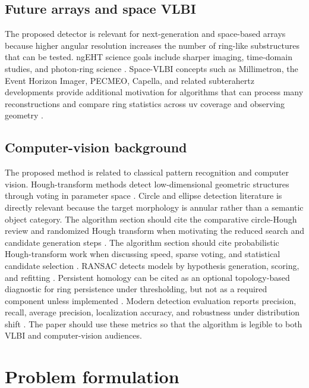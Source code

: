 \documentclass[11pt]{article}
\begin{document}
\subsection{Future arrays and space VLBI}
The proposed detector is relevant for next-generation and space-based arrays because higher angular resolution increases the number of ring-like substructures that can be tested. ngEHT science goals include sharper imaging, time-domain studies, and photon-ring science \citep{Johnson2023,LupsascaBlackHoleExplorer2024}. Space-VLBI concepts such as Millimetron, the Event Horizon Imager, PECMEO, Capella, and related subterahertz developments provide additional motivation for algorithms that can process many reconstructions and compare ring statistics across uv coverage and observing geometry \citep{Novikov2021,Rudnitskiy2021,Rudnitskiy2023,Martin2019,Kudriashov2019,Kudriashov2021,Roelofs2019,Trippe2023,Likhachev2024,Shlentsova2024}.

\subsection{Computer-vision background}
The proposed method is related to classical pattern recognition and computer vision. Hough-transform methods detect low-dimensional geometric structures through voting in parameter space \citep{DudaHart1972}. Circle and ellipse detection literature is directly relevant because the target morphology is annular rather than a semantic object category. The algorithm section should cite the comparative circle-Hough review and randomized Hough transform when motivating the reduced search and candidate generation steps \citep{YUEN199071,Xu1990}. The algorithm section should cite probabilistic Hough-transform work when discussing speed, sparse voting, and statistical candidate selection \citep{KALVIAINEN1995239}. RANSAC detects models by hypothesis generation, scoring, and refitting \citep{FischlerBolles1981}. Persistent homology can be cited as an optional topology-based diagnostic for ring persistence under thresholding, but not as a required component unless implemented \citep{Bauer2014}. Modern detection evaluation reports precision, recall, average precision, localization accuracy, and robustness under distribution shift \citep{Everingham2010,LinCOCO2014}. The paper should use these metrics so that the algorithm is legible to both VLBI and computer-vision audiences.

\section{Problem formulation}
\end{document}

